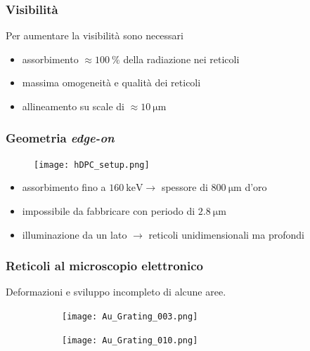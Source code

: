 \documentclass[italian]{beamer}
\begin{document}
\begin{frame}
    \frametitle{Visibilit\`a}
    Per aumentare la visibilit\`a sono necessari
    \begin{itemize}
        \item assorbimento $\approx \SI{100}{\percent}$ della radiazione nei
            reticoli
        \item massima omogeneit\`a e qualit\`a dei reticoli
        \item allineamento su scale di $\approx \SI{10}{\micro\metre}$
    \end{itemize}
\end{frame}

\begin{frame}
    \frametitle{Geometria \emph{edge-on}}
    \begin{figure}[h!]
        \centering
        \texttt{[image: hDPC\_setup.png]}
    \end{figure}
    \begin{itemize}
        \item assorbimento fino a $\SI{160}{\kilo\eV} \longrightarrow$ spessore di $\SI{800}{\micro\metre}$ d'oro
        \item impossibile da fabbricare con periodo di $\SI{2.8}{\micro\metre}$
        \item illuminazione da un lato $\longrightarrow$ reticoli
            unidimensionali ma profondi
    \end{itemize}
\end{frame}

\begin{frame}
    \frametitle{Reticoli al microscopio elettronico}
    Deformazioni e sviluppo incompleto di alcune aree.
    \begin{figure}[h!]
        \centering
        \begin{subfigure}[b]{.49\textwidth}
            \centering
            \texttt{[image: Au\_Grating\_003.png]}
        \end{subfigure}
        \hfill
        \begin{subfigure}[b]{.49\textwidth}
            \centering
            \texttt{[image: Au\_Grating\_010.png]}
        \end{subfigure}
    \end{figure}
\end{frame}
\end{document}

